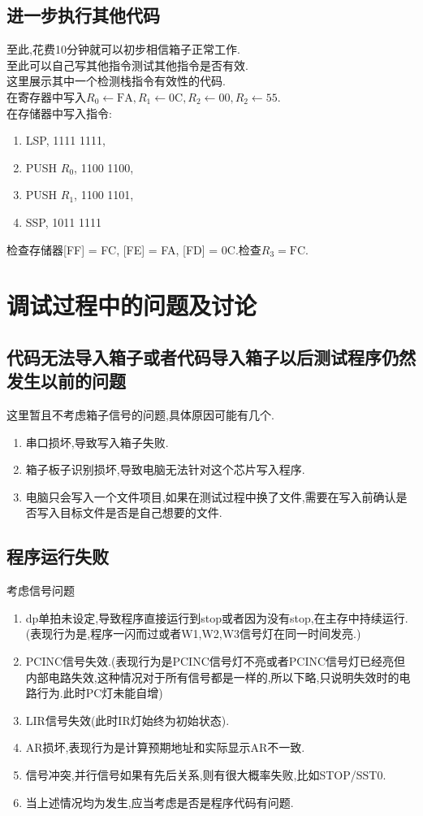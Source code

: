 \documentclass[UTF8]{ctexart}
\begin{document}
\subsection{进一步执行其他代码}
至此,花费10分钟就可以初步相信箱子正常工作.\\
\indent 至此可以自己写其他指令测试其他指令是否有效.\\
\indent 这里展示其中一个检测栈指令有效性的代码.\\
\indent 在寄存器中写入$R_0\leftarrow \text{FA}, R_1\leftarrow \text{0C}, R_2\leftarrow \text{00}, R_2\leftarrow \text{55}$.\\
\indent 在存储器中写入指令:
\begin{enumerate}[\indent\indent]
	\item LSP, 1111 1111,
	\item PUSH $R_0$, 1100 1100,
	\item PUSH $R_1$, 1100 1101,
	\item SSP, 1011 1111
\end{enumerate}
检查存储器[FF] = FC, [FE] = FA, [FD] = 0C.检查$R_3=\text{FC}$.
\section{调试过程中的问题及讨论}
\subsection{代码无法导入箱子或者代码导入箱子以后测试程序仍然发生以前的问题}
这里暂且不考虑箱子信号的问题,具体原因可能有几个.
\begin{enumerate}[1]
	\item 串口损坏,导致写入箱子失败.
	\item 箱子板子识别损坏,导致电脑无法针对这个芯片写入程序.
	\item 电脑只会写入一个文件项目,如果在测试过程中换了文件,需要在写入前确认是否写入目标文件是否是自己想要的文件.
\end{enumerate}
\subsection{程序运行失败}
考虑信号问题
\begin{enumerate}[1]
	\item dp单拍未设定,导致程序直接运行到stop或者因为没有stop,在主存中持续运行.(表现行为是,程序一闪而过或者W1,W2,W3信号灯在同一时间发亮.)
	\item PCINC信号失效.(表现行为是PCINC信号灯不亮或者PCINC信号灯已经亮但内部电路失效,这种情况对于所有信号都是一样的,所以下略,只说明失效时的电路行为.此时PC灯未能自增)
	\item LIR信号失效(此时IR灯始终为初始状态).
	\item AR损坏,表现行为是计算预期地址和实际显示AR不一致.
	\item 信号冲突,并行信号如果有先后关系,则有很大概率失败,比如STOP/SST0.
	\item 当上述情况均为发生,应当考虑是否是程序代码有问题.
\end{enumerate}
\end{document}

